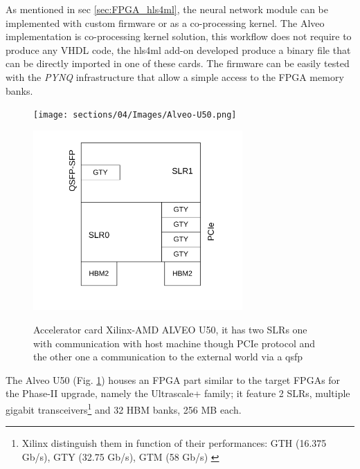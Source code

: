 \documentclass[../../main.tex]{subfiles}
\begin{document}
As mentioned in sec \ref{sec:FPGA_hls4ml}, the neural network module can be implemented with custom firmware or as a co-processing kernel. The Alveo implementation is co-processing kernel solution, this workflow does not require to produce any VHDL code, the hls4ml add-on developed produce a binary file that can be directly imported in one of these cards. The firmware can be easily tested with the \textit{PYNQ} infrastructure that allow a simple access to the FPGA memory banks.
    
\begin{figure}[h]
\begin{minipage}[c]{0.5\linewidth}
    \vspace{0pt}
    \centering
        \texttt{[image: sections/04/Images/Alveo-U50.png]}
        \label{fig:ALVEO-U50_card}
\end{minipage}%
\hfill%
\begin{minipage}[c]{0.5\linewidth}
    \vspace{0pt}
    \centering
        \includegraphics[width=8cm]{sections/04/Images/Alveo-U50-connections.pdf}
        \label{fig:ALVEO-U50_struct}
\end{minipage}%
\caption{Accelerator card Xilinx-AMD ALVEO U50, it has two SLRs one with communication with host machine though PCIe protocol   and the other one a communication to the external world via a \acrshort{qsfp}}
\label{fig:ALVEO}
\end{figure}

The Alveo U50 (Fig. \ref{fig:ALVEO}) houses an FPGA part similar to the target FPGAs for the Phase-II upgrade, namely the Ultrascale+ family; it feature 2 SLRs, multiple gigabit transceivers\footnote{Xilinx distinguish them in function of their performances: GTH (16.375 Gb/s), GTY (32.75 Gb/s), GTM (58 Gb/s) \cite{Xilinx-GT}} and 32 HBM banks, 256 MB each.  
\end{document}

